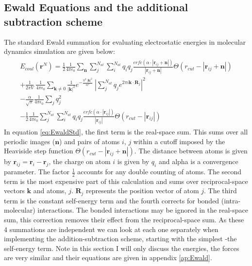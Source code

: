 \subsection{Ewald Equations and the additional subtraction scheme}
The standard Ewald summation for evaluating electrostatic energies in molecular dynamics simulation are given below:
\begin{eqnarray}
  \begin{split}
E_{coul}\left(\mathbf{r}^{N}\right)
=
\frac{1}{2}\frac{1}{4 \pi \epsilon_0} \sum_{\mathbf{n}} \sum_{j}^{N_{at}} \sum_{i}^{N_{at}} q_i q_j \frac{erfc\left( \alpha \cdot |\mathbf{r}_{ij} + \mathbf{n}|\right)}{|\mathbf{r}_{ij} + \mathbf{n}|} \Theta\left( r_{cut} - |\mathbf{r}_{ij} + \mathbf{n}| \right)
\\
+
\frac{1}{2\pi V} \ \frac{1}{4 \pi \epsilon_0} \sum_{\mathbf{k} \neq 0} \frac{1}{|\mathbf{k}|^2} e^{-\frac{\pi^2 \ |\mathbf{k}|^2}{\alpha^2}} \ \left|\sum_{j}^{N_{at}} q_{j} e^{2\pi i \mathbf{k} \cdot \mathbf{R}_{j}}\right|^2 \\
- \frac{\alpha}{\sqrt{\pi}} \frac{1}{4 \pi \epsilon_{0}} \sum_{j} q_{j}^2
\\
- \frac{1}{2} \frac{1}{4 \pi \epsilon_0} \sum_{j}^{N_{at}} \sum_{i}^{N_{at}} q_i q_j \frac{erfc\left( \alpha \cdot |\mathbf{r}_{ij}|\right)}{|\mathbf{r}_{ij}|} \Theta\left( r_{cut} - |\mathbf{r}_{ij}| \right) 
	\end{split}
\label{eq:EwaldStd}
\end{eqnarray}
In equation \eqref{eq:EwaldStd}, the first term is the real-space sum. This sums over all periodic images ($\mathbf{n}$) and pairs of atoms $i$, $j$ within a cutoff imposed by the Heaviside step function $\Theta(r_{cut} - |\mathbf{r}_{ij}+\mathbf{n}|)$. The distance between atoms is given by $\mathbf{r}_{ij} = \mathbf{r}_{i} - \mathbf{r}_{j}$, the charge on atom $i$ is given by $q_{i}$ and alpha is a convergence parameter. The factor $\frac{1}{2}$ accounts for any double counting of atoms. The second term is the most expensive part of this calculation and sums over reciprocal-space vectors $\mathbf{k}$ and atoms, $j$. $\mathbf{R}_{j}$ represents the position vector of atom $j$. The third term is the constant self-energy term and the fourth corrects for bonded  (intra-molecular) interactions. The bonded interactions may be ignored in the real-space sum, this correction removes their effect from the reciprocal-space sum. As these 4 summations are independent we can look at each one separately when implementing the addition-subtraction scheme, starting with the simplest -the self-energy term. Note in this section I will only discuss the energies, the forces are very similar and their equations are given in appendix \ref{ap:Ewald}.
